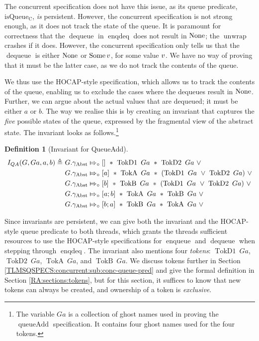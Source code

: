 \documentclass[a4paper, 10pt]{report}
\theoremstyle{definition}
\newtheorem{definition}{Definition}[section]
\newcommand{\enqueue}{\operatorname{enqueue}}
\newcommand{\dequeue}{\operatorname{dequeue}}
\newcommand{\unwrap}{\operatorname{unwrap}}
\newcommand{\enqdeq}{\operatorname{enqdeq}}
\newcommand{\queueAdd}{\operatorname{queueAdd}}
\newcommand{\isqueueconc}{\operatorname{isQueue_{C}}}
\newcommand{\QueueAddInvariant}{I_{QA}}
\newcommand{\Qg}{G}
\newcommand{\QAg}{Ga}
\newcommand{\gabst}{\gname_{\mathrm{Abst}}}
\newcommand{\TokDo}[1]{\operatorname{TokD1} ~ #1}
\newcommand{\TokDoQAg}{\TokDo{\QAg}}
\newcommand{\TokDt}[1]{\operatorname{TokD2} ~ #1}
\newcommand{\TokDtQAg}{\TokDt{\QAg}}
\newcommand{\TokA}[1]{\operatorname{TokA} ~ #1}
\newcommand{\TokAQAg}{\TokA{\QAg}}
\newcommand{\TokB}[1]{\operatorname{TokB} ~ #1}
\newcommand{\TokBQAg}{\TokB{\QAg}}
\newcommand{\abstractstatefullfrag}[2]{#1 \Mapsto_{\circ} #2}
\begin{document}
The concurrent specification does not have this issue, as its queue predicate, $\isqueueconc$, \textit{is} persistent. However, the concurrent specification is not strong enough, as it does not track the state of the queue. It is paramount for correctness that the $\dequeue$ in $\enqdeq$ does not result in $\operatorname{None}$; the $\unwrap$ crashes if it does. However, the concurrent specification only tells us that the $\dequeue$ is either $\operatorname{None}$ or $\operatorname{Some} v$, for some value $v$. We have no way of proving that it must be the latter case, as we do not track the contents of the queue.

We thus use the HOCAP-style specification, which allows us to track the contents of the queue, enabling us to exclude the cases where the dequeues result in $\operatorname{None}$. Further, we can argue about the actual values that are dequeued; it must be either $a$ or $b$. The way we realise this is by creating an invariant that captures the \textit{five} possible states of the queue, expressed by the fragmental view of the abstract state. The invariant looks as follows.\footnote{The variable $\QAg$ is a collection of ghost names used in proving the $\queueAdd$ specification. It contains four ghost names used for the four tokens.}
\begin{definition}[Invariant for QueueAdd]\label{QueueSpecs:queueadd:invariant}
  \begin{align*}
    \QueueAddInvariant(\Qg, \QAg, a, b) \eqdef~
    &\abstractstatefullfrag{\Qg.\gabst}{[]}~\star~\TokDoQAg~\star~\TokDtQAg~\lor\\
    &\abstractstatefullfrag{\Qg.\gabst}{[a]}~\star~\TokAQAg~\star~(\TokDoQAg~\lor~\TokDtQAg)~\lor\\
    &\abstractstatefullfrag{\Qg.\gabst}{[b]}~\star~\TokBQAg~\star~(\TokDoQAg~\lor~\TokDtQAg)~\lor\\
    &\abstractstatefullfrag{\Qg.\gabst}{[a; b]}~\star~\TokAQAg~\star~\TokBQAg~\lor\\
    &\abstractstatefullfrag{\Qg.\gabst}{[b; a]}~\star~\TokBQAg~\star~\TokAQAg~\lor
  \end{align*}
\end{definition}
Since invariants are persistent, we can give both the invariant and the HOCAP-style queue predicate to both threads, which grants the threads sufficient resources to use the HOCAP-style specifications for $\enqueue$ and $\dequeue$ when stepping through $\enqdeq$. The invariant also mentions four \textit{tokens}: $\TokDoQAg$, $\TokDtQAg$, $\TokAQAg$, and $\TokBQAg$. We discuss tokens further in Section \ref{TLMSQSPECS:concurrent:sub:conc-queue-pred} and give the formal definition in Section \ref{RA:sections:tokens}, but for this section, it suffices to know that new tokens can always be created, and ownership of a token is \textit{exclusive}.\\
\end{document}

